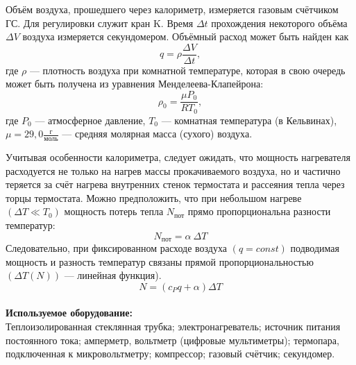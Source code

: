 \documentclass[a4paper, 12pt]{article}%
\begin{document}
	Объём воздуха, прошедшего через калориметр, измеряется газовым счётчиком ГС. Для регулировки служит кран K. Время $\Delta t$ прохождения некоторого объёма $\Delta V$ воздуха измеряется секундомером. Объёмный расход может быть найден как
	\[
	q = \rho \frac{\Delta V}{\Delta t},
	\]
	где $ \rho $ --- плотность воздуха при комнатной температуре, которая в свою очередь может быть получена из уравнения Менделеева-Клапейрона:
	\[
	\rho_0 = \frac{\mu P_0}{R T_0},
	\]
	где $P_0$ --- атмосферное давление, $T_0$ --- комнатная температура (в Кельвинах), $\mu = 29,0 \frac{\text{г}}{\text{моль}}$ --- средняя молярная масса (сухого) воздуха.
	
	Учитывая особенности калориметра, следует ожидать, что мощность нагревателя расходуется не только на нагрев массы прокачиваемого воздуха, но и частично теряется за счёт нагрева внутренних стенок термостата и рассеяния тепла через торцы термостата. Можно предположить, что при небольшом нагреве $(\Delta T \ll T_0)$ мощность потерь тепла $N_{\text{пот}}$ прямо пропорциональна разности температур:
	\[
	N_{\text{пот}}=\alpha\ \Delta T
	\]
	Следовательно, при фиксированном расходе воздуха $(q = const)$ подводимая мощность и разность температур связаны прямой пропорциональностью $\left( \Delta T (N) \right)$ --- линейная функция).
	\[
	N = (c_Pq+\alpha)\Delta T
	\]\\
	
	
	\textbf{Используемое оборудование: }\\
	
	
	Теплоизолированная стеклянная трубка; электронагреватель; источник питания постоянного тока; амперметр, вольтметр (цифровые мультиметры); термопара, подключенная к микровольтметру; компрессор; газовый счётчик;
	секундомер.\\
	
\end{document}

